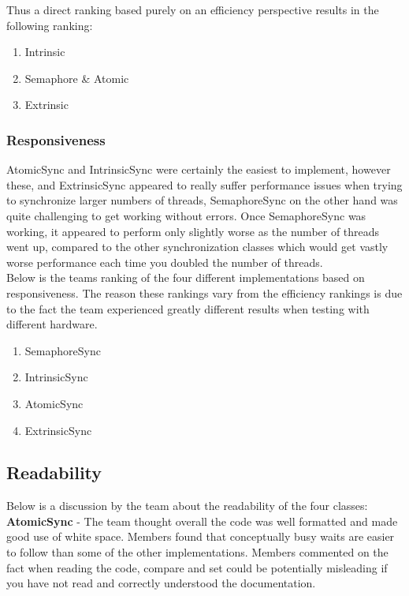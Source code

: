\documentclass[11pt]{article}
\begin{document}
Thus a direct ranking based purely on an efficiency perspective results in the following ranking: 

\begin{enumerate}
	\item Intrinsic
	\item Semaphore \& Atomic
	\item Extrinsic
\end{enumerate}

\subsubsection{Responsiveness}

AtomicSync and IntrinsicSync were certainly the easiest to implement, however these, and ExtrinsicSync appeared to really suffer performance issues when trying to synchronize larger numbers of threads, SemaphoreSync on the other hand was quite challenging to get working without errors. Once SemaphoreSync was working, it appeared to perform only slightly worse as the number of threads went up,  compared to the other synchronization classes which would get vastly worse performance each time you doubled the number of threads. \\

Below is the teams ranking of the four different implementations based on responsiveness. The reason these rankings vary from the efficiency rankings is due to the fact the team experienced greatly different results when testing with different hardware.
\begin{enumerate}
\item SemaphoreSync 
\item IntrinsicSync
\item AtomicSync
\item ExtrinsicSync

\end{enumerate}

\pagebreak
\subsection{Readability}


Below is a discussion by the team about the readability of the four classes: \\

\textbf{AtomicSync} - The team thought overall the code was well formatted and made good use of white space. Members found that conceptually busy waits are easier to follow than some of the other implementations. Members commented on the fact when reading the code, compare and set could be potentially misleading if you have not read and correctly understood the documentation.\\
\end{document}
